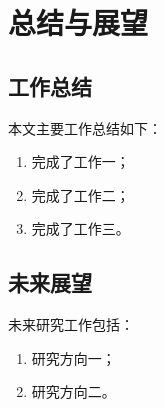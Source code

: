 
\chapter{总结与展望}

\section{工作总结}

本文主要工作总结如下：
\begin{enumerate}
  \item 完成了工作一；
  \item 完成了工作二；
  \item 完成了工作三。
\end{enumerate}

\section{未来展望}

未来研究工作包括：
\begin{enumerate}
  \item 研究方向一；
  \item 研究方向二。
\end{enumerate}
